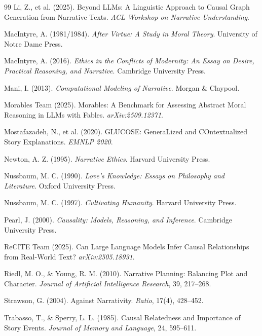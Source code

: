 \documentclass[11pt,letterpaper]{article}
\theoremstyle{defn}
\begin{document}
\begin{thebibliography}{99}
Li, Z., et al. (2025). Beyond LLMs: A Linguistic Approach to Causal Graph Generation from Narrative Texts. \textit{ACL Workshop on Narrative Understanding}.

MacIntyre, A. (1981/1984). \textit{After Virtue: A Study in Moral Theory}. University of Notre Dame Press.

MacIntyre, A. (2016). \textit{Ethics in the Conflicts of Modernity: An Essay on Desire, Practical Reasoning, and Narrative}. Cambridge University Press.

Mani, I. (2013). \textit{Computational Modeling of Narrative}. Morgan \& Claypool.

Morables Team (2025). Morables: A Benchmark for Assessing Abstract Moral Reasoning in LLMs with Fables. \textit{arXiv:2509.12371}.

Mostafazadeh, N., et al. (2020). GLUCOSE: GeneraLized and COntextualized Story Explanations. \textit{EMNLP 2020}.

Newton, A. Z. (1995). \textit{Narrative Ethics}. Harvard University Press.

Nussbaum, M. C. (1990). \textit{Love's Knowledge: Essays on Philosophy and Literature}. Oxford University Press.

Nussbaum, M. C. (1997). \textit{Cultivating Humanity}. Harvard University Press.

Pearl, J. (2000). \textit{Causality: Models, Reasoning, and Inference}. Cambridge University Press.

ReCITE Team (2025). Can Large Language Models Infer Causal Relationships from Real-World Text? \textit{arXiv:2505.18931}.

Riedl, M. O., \& Young, R. M. (2010). Narrative Planning: Balancing Plot and Character. \textit{Journal of Artificial Intelligence Research}, 39, 217--268.

Strawson, G. (2004). Against Narrativity. \textit{Ratio}, 17(4), 428--452.

Trabasso, T., \& Sperry, L. L. (1985). Causal Relatedness and Importance of Story Events. \textit{Journal of Memory and Language}, 24, 595--611.


\end{thebibliography}
\end{document}
